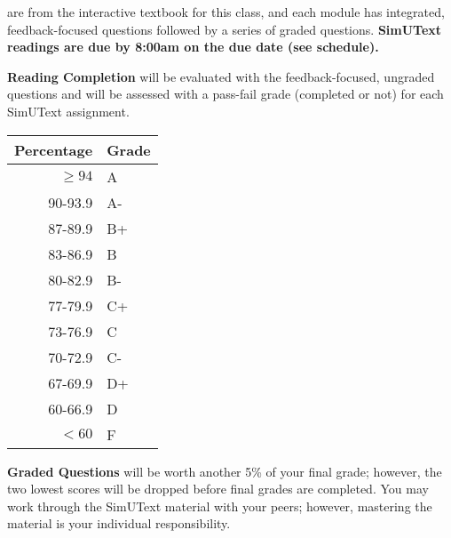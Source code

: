 \documentclass{tufte-handout}
\begin{document}
 are from the interactive textbook for this class, and each module has integrated, feedback-focused questions followed by a series of graded questions. \textbf{SimUText readings are due by 8:00am on the due date (see schedule).} 

\textbf{Reading Completion} will be evaluated with the feedback-focused, ungraded questions and will be assessed with a pass-fail grade (completed or not) for each SimUText assignment. 

\begin{margintable}
\begin{tabular}{rl}
Percentage & Grade \\
\hline 
$\ge94$ & A \\
90-93.9 & A- \\
87-89.9 & B+ \\
83-86.9 & B \\
80-82.9 & B- \\
77-79.9 & C+ \\
73-76.9 & C \\
70-72.9 & C- \\
67-69.9 & D+ \\
60-66.9 & D \\
$<60$ & F \\
\hline
\end{tabular}
\end{margintable}


\textbf{Graded Questions} will be worth another 5\% of your final grade; however, the two lowest scores will be dropped before final grades are completed. You may work through the SimUText material with your peers; however, mastering the material is your individual responsibility.
\end{document}
